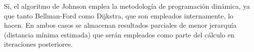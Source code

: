 \documentclass[../tp2_grupo404.tex]{subfiles}
\begin{document}
Sí, el algoritmo de Johnson emplea la metodología de programación
dinámica, ya que tanto Bellman-Ford como Dijkstra, que son empleados
internamente, lo hacen. En ambos casos se almacenan resultados
parciales de menor jerarquía (distancia mínima estimada) que serán
empleados como parte del cálculo en iteraciones posteriores.

\end{document}
